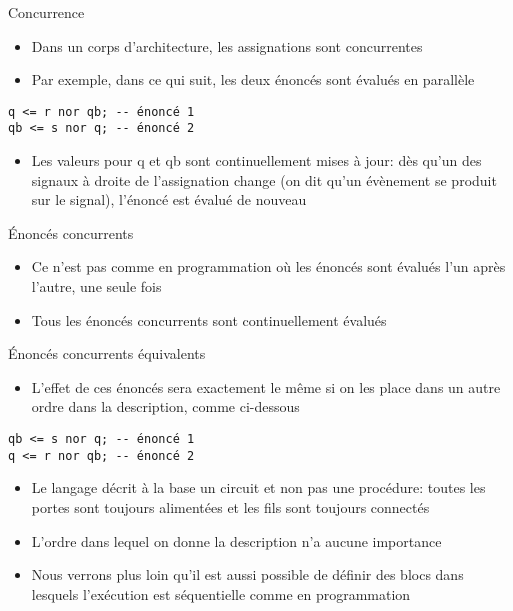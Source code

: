 \documentclass[presentation]{beamer}
\begin{document}
\begin{frame}[label={sec:org9971599},fragile]{Concurrence}
 \begin{itemize}
\item Dans un corps d'architecture, les assignations sont \alert{concurrentes}
\item Par exemple, dans ce qui suit, les deux énoncés sont évalués en parallèle
\end{itemize}

\begin{verbatim}
q <= r nor qb; -- énoncé 1
qb <= s nor q; -- énoncé 2
\end{verbatim}

\begin{itemize}
\item Les valeurs pour q et qb sont continuellement mises à jour: dès qu'un des signaux à droite de l'assignation change (on dit qu'un évènement se produit sur le signal), l'énoncé est évalué de nouveau
\end{itemize}
\end{frame}

\begin{frame}[label={sec:org815b55a}]{Énoncés concurrents}
\begin{itemize}
\item \alert{Ce n'est pas comme en programmation} où les énoncés sont évalués l'un après l'autre, une seule fois
\item Tous les énoncés concurrents sont continuellement évalués
\end{itemize}
\end{frame}

\begin{frame}[label={sec:orge17f144},fragile]{Énoncés concurrents équivalents}
 \begin{itemize}
\item L'effet de ces énoncés sera exactement le même si on les place dans un autre ordre dans la description, comme ci-dessous
\end{itemize}

\begin{verbatim}
qb <= s nor q; -- énoncé 1
q <= r nor qb; -- énoncé 2
\end{verbatim}

\begin{itemize}
\item Le langage décrit à la base un circuit et non pas une procédure: toutes les portes sont toujours alimentées et les fils sont toujours connectés
\item L'ordre dans lequel on donne la description n'a \alert{aucune importance}
\item Nous verrons plus loin qu'il est aussi possible de définir des blocs dans lesquels l'exécution est séquentielle comme en programmation
\end{itemize}
\end{frame}
\end{document}
